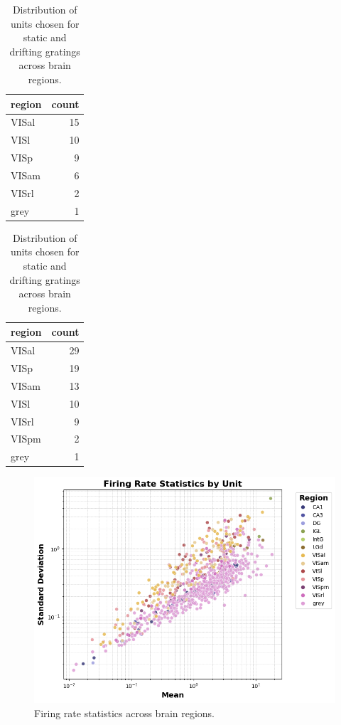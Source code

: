 \documentclass[10pt,twocolumn]{article}
\begin{document}
\begin{table}[h]
  \centering
  \begin{subtable}[t]{0.48\linewidth}
    \centering
    \begin{tabular}{lr}
      \toprule
      region & count \\
      \midrule
      VISal & 15 \\
      VISl & 10 \\
      VISp & 9 \\
      VISam & 6 \\
      VISrl & 2 \\
      grey & 1 \\
      \bottomrule
    \end{tabular}
    \caption{Static gratings}
    \label{tab:chosen-static}
  \end{subtable}
  \hfill
  \begin{subtable}[t]{0.48\linewidth}
    \centering
    \begin{tabular}{lr}
      \toprule
      region & count \\
      \midrule
      VISal & 29 \\
      VISp & 19 \\
      VISam & 13 \\
      VISl & 10 \\
      VISrl & 9 \\
      VISpm & 2 \\
      grey & 1 \\
      \bottomrule
    \end{tabular}
    \caption{Drifting gratings}
    \label{tab:chosen-drifting}
  \end{subtable}
  \caption{Distribution of units chosen for static and drifting gratings across brain regions.}
  \label{tab:chosen-regions-combined}
\end{table}

\begin{figure}[ht]
  \centering
  \includegraphics[width=\linewidth]{report_images/unit_firing_rate_statistics.png}
  \caption{Firing rate statistics across brain regions.}
  \label{fig:firing_rate_stats}
\end{figure}
\end{document}
